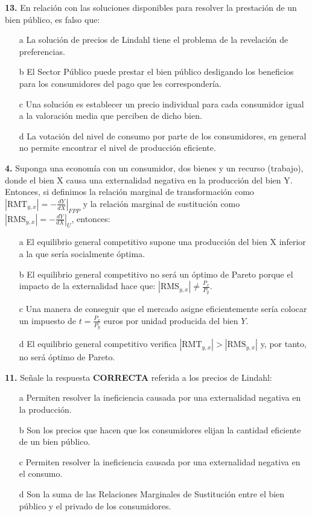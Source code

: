 \documentclass{nuevotema}
\begin{document}
\textbf{13.} En relación con las soluciones disponibles para resolver la prestación de un bien público, es falso que:

\begin{itemize}
	\item[a] La solución de precios de Lindahl tiene el problema de la revelación de preferencias.
	\item[b] El Sector Público puede prestar el bien público desligando los beneficios para los consumidores del pago que les correspondería.
	\item[c] Una solución es establecer un precio individual para cada consumidor igual a la valoración media que perciben de dicho bien.
	\item[d] La votación del nivel de consumo por parte de los consumidores, en general no permite encontrar el nivel de producción eficiente.
\end{itemize}


\textbf{4.} Suponga una economía con un consumidor, dos bienes y un recurso (trabajo), donde el bien X causa una externalidad negativa en la producción del bien Y. Entonces, si definimos la relación marginal de transformación como $\left| \text{RMT}_{y,x} \right| = - \left. \frac{d Y}{d X} \right|_{FPP}$ y la relación marginal de sustitución como $\left| \text{RMS}_{y,x} \right| = \left. - \frac{d Y}{d X} \right|_{U}$, entonces:

\begin{itemize}
	\item[a] El equilibrio general competitivo supone una producción del bien X inferior a la que sería socialmente óptima.
	\item[b] El equilibrio general competitivo no será un óptimo de Pareto porque el impacto de la externalidad hace que: $\left| \text{RMS}_{y,x} \right| \neq \frac{P_x}{P_y}$.
	\item[c] Una manera de conseguir que el mercado asigne eficientemente sería colocar un impuesto de $t=\frac{P_x}{P_y}$ euros por unidad producida del bien $Y$.
	\item[d] El equilibrio general competitivo verifica $\left| \text{RMT}_{y,x} \right| > \left| \text{RMS}_{y,x} \right|$ y, por tanto, no será óptimo de Pareto.
\end{itemize}


\textbf{11.} Señale la respuesta \textbf{CORRECTA} referida a los precios de Lindahl:
\begin{itemize}
	\item[a] Permiten resolver la ineficiencia causada por una externalidad negativa en la producción.
	\item[b] Son los precios que hacen que los consumidores elijan la cantidad eficiente de un bien público.
	\item[c] Permiten resolver la ineficiencia causada por una externalidad negativa en el consumo.
	\item[d] Son la suma de las Relaciones Marginales de Sustitución entre el bien público y el privado de los consumidores.
\end{itemize}
\end{document}
